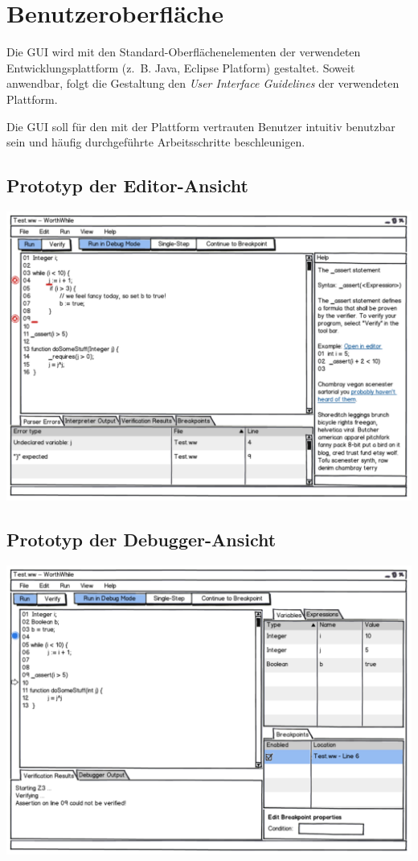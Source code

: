 \section{Benutzeroberfläche}%

Die GUI wird mit den Standard-Oberflächenelementen der verwendeten Entwicklungsplattform (z.~B. Java, Eclipse Platform) gestaltet. Soweit anwendbar, folgt die Gestaltung den \emph{User Interface Guidelines} der verwendeten Plattform.

Die GUI soll für den mit der Plattform vertrauten Benutzer intuitiv benutzbar sein und häufig durchgeführte Arbeitsschritte beschleunigen.

\subsection{Prototyp der Editor-Ansicht}%

\includegraphics[width=\textwidth]{mockup/editor.pdf}

\subsection{Prototyp der Debugger-Ansicht}%

\includegraphics[width=\textwidth]{mockup/debug.pdf}
